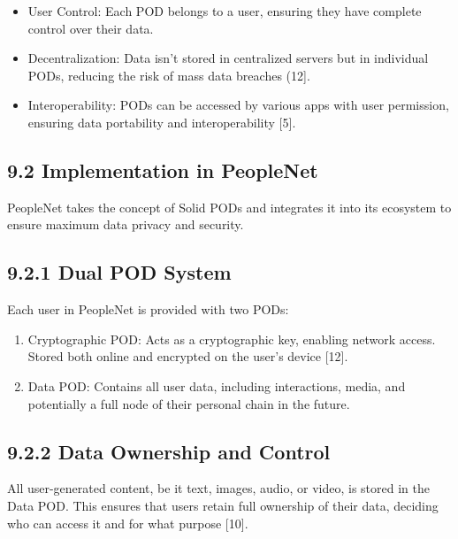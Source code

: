 \documentclass[10pt]{article}
\begin{document}
\begin{itemize}
  \item User Control: Each POD belongs to a user, ensuring they have complete control over their data.
  \item Decentralization: Data isn't stored in centralized servers but in individual PODs, reducing the risk of mass data breaches (12].
  \item Interoperability: PODs can be accessed by various apps with user permission, ensuring data portability and interoperability [5].
\end{itemize}

\subsection*{9.2 Implementation in PeopleNet}
PeopleNet takes the concept of Solid PODs and integrates it into its ecosystem to ensure maximum data privacy and security.

\subsection*{9.2.1 Dual POD System}
Each user in PeopleNet is provided with two PODs:

\begin{enumerate}
  \item Cryptographic POD: Acts as a cryptographic key, enabling network access. Stored both online and encrypted on the user's device [12].
  \item Data POD: Contains all user data, including interactions, media, and potentially a full node of their personal chain in the future.
\end{enumerate}

\subsection*{9.2.2 Data Ownership and Control}
All user-generated content, be it text, images, audio, or video, is stored in the Data POD. This ensures that users retain full ownership of their data, deciding who can access it and for what purpose [10].
\end{document}
